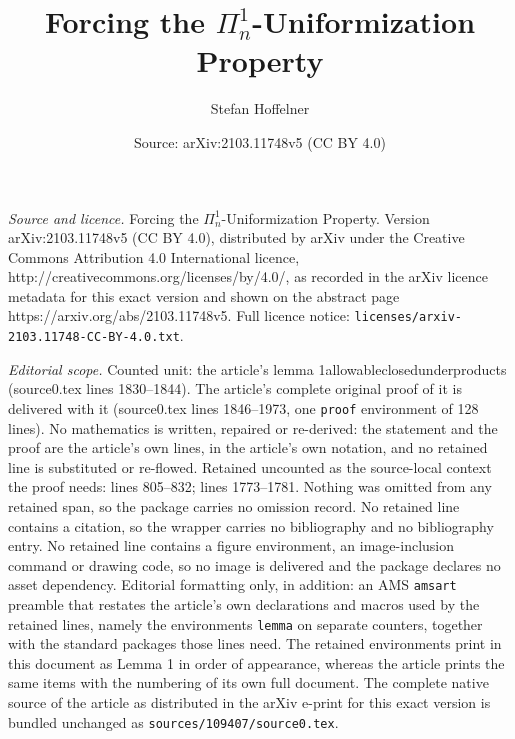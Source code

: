 \documentclass[10pt,a4paper]{amsart}
\title{Forcing the ${\Pi^1_n}$-Uniformization Property}
\author{Stefan Hoffelner}
\date{Source: arXiv:2103.11748v5 (CC BY 4.0)}
\begin{document}
\maketitle

\noindent\emph{Source and licence.} Forcing the ${\Pi^1_n}$-Uniformization Property. Version arXiv:2103.11748v5 (CC BY 4.0), distributed by arXiv under the Creative Commons Attribution 4.0 International licence, http://creativecommons.org/licenses/by/4.0/, as recorded in the arXiv licence metadata for this exact version and shown on the abstract page https://arxiv.org/abs/2103.11748v5. Full licence notice: \texttt{licenses/arxiv-2103.11748-CC-BY-4.0.txt}.\par\smallskip

\noindent\textit{Editorial scope.} Counted unit: the article's lemma 1allowableclosedunderproducts (source0.tex lines 1830--1844). The article's complete original proof of it is delivered with it (source0.tex lines 1846--1973, one \texttt{proof} environment of 128 lines). No mathematics is written, repaired or re-derived: the statement and the proof are the article's own lines, in the article's own notation, and no retained line is substituted or re-flowed.  Retained uncounted as the source-local context the proof needs: lines 805--832; lines 1773--1781.  Nothing was omitted from any retained span, so the package carries no omission record.  No retained line contains a citation, so the wrapper carries no bibliography and no bibliography entry.  No retained line contains a figure environment, an image-inclusion command or drawing code, so no image is delivered and the package declares no asset dependency.  Editorial formatting only, in addition: an AMS \texttt{amsart} preamble that restates the article's own declarations and macros used by the retained lines, namely the environments \texttt{lemma} on separate counters, together with the standard packages those lines need.  The retained environments print in this document as Lemma 1 in order of appearance, whereas the article prints the same items with the numbering of its own full document.  The complete native source of the article as distributed in the arXiv e-print for this exact version is bundled unchanged as \texttt{sources/109407/source0.tex}.
\end{document}

